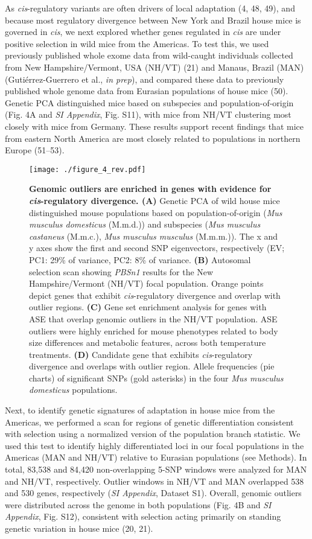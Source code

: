 \documentclass[9pt,twocolumn,twoside,lineno]{pnas-new}
\begin{document}
As \emph{cis}-regulatory variants are often drivers of local adaptation
(4, 48, 49), and because most regulatory divergence between New York and
Brazil house mice is governed in \emph{cis}, we next explored whether
genes regulated in \emph{cis} are under positive selection in wild mice
from the Americas. To test this, we used previously published whole
exome data from wild-caught individuals collected from New
Hampshire/Vermont, USA (NH/VT) (21) and Manaus, Brazil (MAN)
(Gutiérrez-Guerrero et al., \emph{in prep}), and compared these data to
previously published whole genome data from Eurasian populations of
house mice (50). Genetic PCA distinguished mice based on subspecies and
population-of-origin (Fig. 4A and \emph{SI Appendix}, Fig. S11), with
mice from NH/VT clustering most closely with mice from Germany. These
results support recent findings that mice from eastern North America are
most closely related to populations in northern Europe (51--53).

\begin{figure*}[t]
  \texttt{[image: ./figure\_4\_rev.pdf]}
  \caption{\textbf{Genomic outliers are enriched in genes with evidence for} \textbf{\textit{cis}-regulatory divergence. (A)} Genetic PCA of wild house mice distinguished mouse populations based on population-of-origin (\textit{Mus musculus domesticus} (M.m.d.)) and subspecies (\textit{Mus musculus castaneus} (M.m.c.), \textit{Mus musculus musculus} (M.m.m.)). The x and y axes show the first and second SNP eigenvectors, respectively (EV; PC1: 29\% of variance, PC2: 8\% of variance. \textbf{(B)} Autosomal selection scan showing \textit{PBSn1} results for the New Hampshire/Vermont (NH/VT) focal population. Orange points depict genes that exhibit \textit{cis}-regulatory divergence and overlap with outlier regions. \textbf{(C)} Gene set enrichment analysis for genes with ASE that overlap genomic outliers in the NH/VT population. ASE outliers were highly enriched for mouse phenotypes related to body size differences and metabolic features, across both temperature treatments. \textbf{(D)} Candidate gene that exhibits \textit{cis}-regulatory divergence and overlaps with outlier region. Allele frequencies (pie charts) of significant SNPs (gold asterisks) in the four \textit{Mus musculus domesticus} populations.}
\end{figure*}

Next, to identify genetic signatures of adaptation in house mice from
the Americas, we performed a scan for regions of genetic differentiation
consistent with selection using a normalized version of the population
branch statistic. We used this test to identify highly differentiated
loci in our focal populations in the Americas (MAN and NH/VT) relative
to Eurasian populations (see Methods). In total, 83,538 and 84,420
non-overlapping 5-SNP windows were analyzed for MAN and NH/VT,
respectively. Outlier windows in NH/VT and MAN overlapped 538 and 530
genes, respectively (\emph{SI Appendix}, Dataset S1). Overall, genomic
outliers were distributed across the genome in both populations (Fig. 4B
and \emph{SI Appendix}, Fig. S12), consistent with selection acting
primarily on standing genetic variation in house mice (20, 21).
\end{document}
